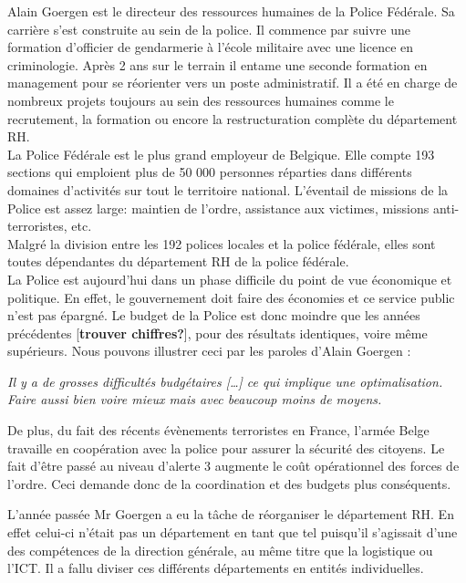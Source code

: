 
Alain Goergen est le directeur des ressources humaines de la Police Fédérale. Sa carrière s'est construite au sein de la police. Il commence par suivre une formation d'officier de gendarmerie à l'école militaire avec une licence en criminologie. Après 2 ans sur le terrain il entame une seconde formation en management pour se réorienter vers un poste administratif. Il a été en charge de nombreux projets toujours au sein des ressources humaines comme le recrutement, la formation ou encore la restructuration complète du département RH.\\

La Police Fédérale est le plus grand employeur de Belgique. Elle compte 193 sections qui emploient plus de 50 000 personnes réparties dans différents domaines d'activités sur tout le territoire national. L'éventail de missions de la Police est assez large: maintien de l'ordre, assistance aux victimes, missions anti-terroristes, etc.\\
Malgré la division entre les 192 polices locales et la police fédérale, elles sont toutes dépendantes du département RH de la police fédérale.\\
 
La Police est aujourd'hui dans un phase difficile du point de vue économique et politique. En effet, le gouvernement doit faire des économies et ce service public n'est pas épargné. Le budget de la Police est donc moindre que les années précédentes [\textbf{trouver chiffres?}], pour des résultats identiques, voire même supérieurs. Nous pouvons illustrer ceci par les paroles d'Alain Goergen : 

\begin{center}
	\textit{Il y a de grosses difficultés budgétaires [\ldots] ce qui implique une optimalisation. Faire aussi bien voire mieux mais avec beaucoup moins de moyens.}
\end{center} 

De plus, du fait des récents évènements terroristes en France, l'armée Belge travaille en coopération avec la police pour assurer la sécurité des citoyens. Le fait d'être passé au niveau d'alerte 3 augmente le coût opérationnel des forces de l'ordre. Ceci demande donc de la coordination et des budgets plus conséquents.

L'année passée Mr Goergen a eu la tâche de réorganiser le département RH. En effet celui-ci n'était pas un département en tant que tel puisqu'il s'agissait d'une des compétences de la direction générale, au même titre que la logistique ou l'ICT. Il a fallu diviser ces différents départements en entités individuelles.\\

